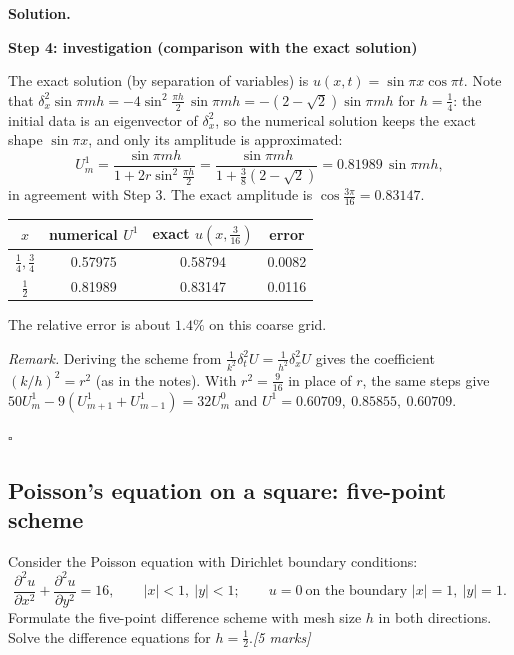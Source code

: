 \documentclass[11pt,a4paper]{article}
\newenvironment{solution}
  {\par\noindent\textbf{Solution.}\par\nobreak}
  {\par\hfill\(\square\)\par}
\newcommand{\step}[1]{\par\addvspace{0.5em}\noindent\textbf{#1}\par\nobreak}
\newcommand{\mk}[1]{\hfill\textit{[#1 marks]}}
\newcommand{\pdd}[2]{\frac{\partial^2 #1}{\partial #2^2}}
\begin{document}
\begin{solution}
\step{Step 4: investigation (comparison with the exact solution)}
The exact solution (by separation of variables) is
\(u(x,t)=\sin\pi x\cos\pi t\).  Note that
\(\delta_x^2\sin\pi mh=-4\sin^2\frac{\pi h}2\,\sin\pi mh=-(2-\sqrt2)\sin\pi mh\)
for \(h=\frac14\): the initial data is an eigenvector of
\(\delta_x^2\), so the numerical solution keeps the exact shape
\(\sin\pi x\), and only its amplitude is approximated:
\[
  U_m^1=\frac{\sin\pi mh}{1+2r\sin^2\frac{\pi h}2}
  =\frac{\sin\pi mh}{1+\frac38(2-\sqrt2)}=0.81989\,\sin\pi mh,
\]
in agreement with Step 3.  The exact amplitude is
\(\cos\frac{3\pi}{16}=0.83147\).
\begin{center}
\renewcommand{\arraystretch}{1.2}
\begin{tabular}{@{}cccc@{}}
\toprule
\(x\)&numerical \(U^1\)&exact \(u(x,\frac3{16})\)&error\\
\midrule
\(\frac14,\frac34\)&0.57975&0.58794&0.0082\\
\(\frac12\)&0.81989&0.83147&0.0116\\
\bottomrule
\end{tabular}
\end{center}
The relative error is about \(1.4\%\) on this coarse grid.

\textit{Remark.}  Deriving the scheme from
\(\frac1{k^2}\delta_t^2U=\frac1{h^2}\delta_x^2U\) gives the coefficient
\((k/h)^2=r^2\) (as in the notes).  With \(r^2=\frac9{16}\) in place of
\(r\), the same steps give
\(50U_m^1-9(U_{m+1}^1+U_{m-1}^1)=32U_m^0\) and
\(U^1=0.60709,\ 0.85855,\ 0.60709\).
\end{solution}

\subsection{Poisson's equation on a square: five-point scheme}

\begin{qbox}
Consider the Poisson equation with Dirichlet boundary conditions:
\[
  \pdd ux+\pdd uy=16,\qquad |x|<1,\ |y|<1;\qquad u=0\ \text{on the boundary } |x|=1,\ |y|=1.
\]
Formulate the five-point difference scheme with mesh size \(h\) in both
directions.  Solve the difference equations for \(h=\frac12\).\mk{5}
\end{qbox}
\end{document}
